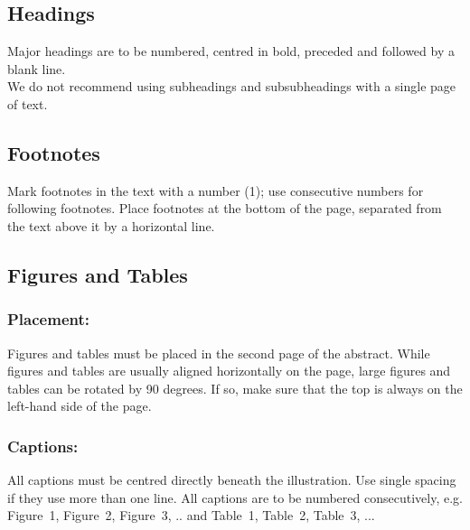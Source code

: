 \documentclass{isprs} %
\begin{document}
\subsection{Headings}\label{sec:Headings}

Major headings are to be numbered, centred in bold, preceded and followed by a blank line.\\
We do not recommend using subheadings and subsubheadings with a single page of text.\\

\subsection{Footnotes}\label{sec:Footnotes}

Mark footnotes in the text with a number (1); use consecutive numbers for following footnotes. Place footnotes at the bottom of the page, separated from the text above it by a horizontal line.


\subsection{Figures and Tables}\label{sec:Illustrations and Tables}

\subsubsection{Placement:}\label{sec:Placement}

Figures and tables must be placed in the second page of the abstract. While figures and tables are usually aligned horizontally on the page, large figures and tables can be rotated by 90 degrees. If so, make sure that the top is always on the left-hand side of the page.

\subsubsection{Captions:}\label{sec:Captions}

All captions must be centred directly beneath the illustration. Use single spacing if they
use more than one line. All captions are to be numbered consecutively,
e.g. Figure~1, Figure~2, Figure~3, ..  and Table~1, Table~2, Table~3, ...
\end{document}
